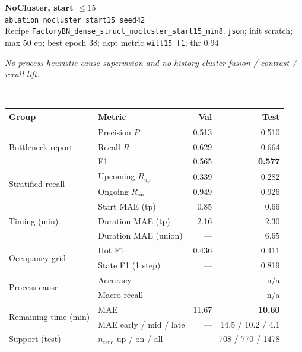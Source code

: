 \documentclass[9pt,a4paper,twocolumn]{extarticle}
\begin{document}
\noindent\begin{minipage}{\columnwidth}
\begin{center}
{\small\bfseries NoCluster, start $\le 15$}\\
{\scriptsize\texttt{ablation\_nocluster\_start15\_seed42}}\\
{\scriptsize Recipe \texttt{FactoryBN\_dense\_struct\_nocluster\_start15\_min8.json}; init scratch; max 50 ep; best epoch 38; ckpt metric \texttt{will15\_f1}; thr 0.94}\\[1pt]
\parbox{0.96\columnwidth}{\scriptsize\itshape No process-heuristic cause supervision and no history-cluster fusion / contrast / recall lift.}\\[2pt]
\scriptsize\setlength{\tabcolsep}{3pt}
\begin{tabular}{llrr}
\toprule
Group & Metric & Val & Test \\
\midrule
\multirow{3}{*}{Bottleneck report}
  & Precision $P$ & 0.513 & 0.510 \\
  & Recall $R$ & 0.629 & 0.664 \\
  & F1 & 0.565 & \textbf{0.577} \\
\midrule
\multirow{2}{*}{Stratified recall}
  & Upcoming $R_{\mathrm{up}}$ & 0.339 & 0.282 \\
  & Ongoing $R_{\mathrm{on}}$ & 0.949 & 0.926 \\
\midrule
\multirow{3}{*}{Timing (min)}
  & Start MAE (tp) & 0.85 & 0.66 \\
  & Duration MAE (tp) & 2.16 & 2.30 \\
  & Duration MAE (union) & --- & 6.65 \\
\midrule
\multirow{2}{*}{Occupancy grid}
  & Hot F1 & 0.436 & 0.411 \\
  & State F1 (1 step) & --- & 0.819 \\
\midrule
\multirow{2}{*}{Process cause}
  & Accuracy & --- & n/a \\
  & Macro recall & --- & n/a \\
\midrule
\multirow{2}{*}{Remaining time (min)}
  & MAE & 11.67 & \textbf{10.60} \\
  & MAE early / mid / late & --- & 14.5 / 10.2 / 4.1 \\
\midrule
Support (test)
  & $n_{\mathrm{true}}$ up / on / all & \multicolumn{2}{r}{708 / 770 / 1478} \\
\bottomrule
\end{tabular}
\end{center}
\end{minipage}\par\vspace{6pt}
\end{document}
